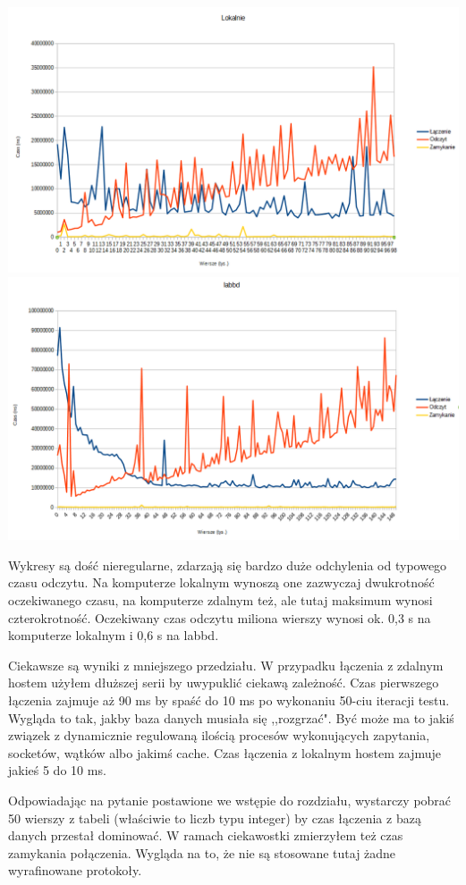 \documentclass[a4paper,11pt]{article}
\begin{document}
\includegraphics[width=\textwidth]{local2.png}
\includegraphics[width=\textwidth]{lab2.png}

Wykresy są dość nieregularne, zdarzają się bardzo duże odchylenia od typowego czasu odczytu. Na komputerze lokalnym wynoszą one zazwyczaj dwukrotność oczekiwanego czasu, na komputerze zdalnym też, ale tutaj maksimum wynosi czterokrotność. Oczekiwany czas odczytu miliona wierszy wynosi ok. 0,3 s na komputerze lokalnym i 0,6 s na labbd.

Ciekawsze są wyniki z mniejszego przedziału. W przypadku łączenia z zdalnym hostem użyłem dłuższej serii by uwypuklić ciekawą zależność. Czas pierwszego łączenia zajmuje aż 90 ms by spaść do 10 ms po wykonaniu 50-ciu iteracji testu. Wygląda to tak, jakby baza danych musiała się ,,rozgrzać". Być może ma to jakiś związek z dynamicznie regulowaną ilością procesów wykonujących zapytania, socketów, wątków albo jakimś cache. Czas łączenia z lokalnym hostem zajmuje jakieś 5 do 10 ms. 

Odpowiadając na pytanie postawione we wstępie do rozdziału, wystarczy pobrać 50 wierszy z tabeli (właściwie to liczb typu integer) by czas łączenia z bazą danych przestał dominować. W ramach ciekawostki zmierzyłem też czas zamykania połączenia. Wygląda na to, że nie są stosowane tutaj żadne wyrafinowane protokoły.
\end{document}
